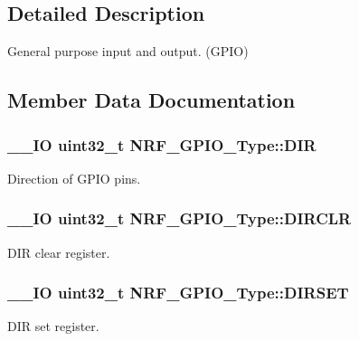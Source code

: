 \subsection{Detailed Description}
General purpose input and output. (G\+P\+I\+O) 

\subsection{Member Data Documentation}
\hypertarget{struct_n_r_f___g_p_i_o___type_a764e29ee686c3f5d869b115a6a54830f}{}
\subsubsection[{D\+I\+R}]{\setlength{\rightskip}{0pt plus 5cm}\+\_\+\+\_\+\+I\+O uint32\+\_\+t N\+R\+F\+\_\+\+G\+P\+I\+O\+\_\+\+Type\+::\+D\+I\+R}\label{struct_n_r_f___g_p_i_o___type_a764e29ee686c3f5d869b115a6a54830f}
Direction of G\+P\+I\+O pins. \hypertarget{struct_n_r_f___g_p_i_o___type_ad112d0855e109acaa63d6a3f1622f1d8}{}
\subsubsection[{D\+I\+R\+C\+L\+R}]{\setlength{\rightskip}{0pt plus 5cm}\+\_\+\+\_\+\+I\+O uint32\+\_\+t N\+R\+F\+\_\+\+G\+P\+I\+O\+\_\+\+Type\+::\+D\+I\+R\+C\+L\+R}\label{struct_n_r_f___g_p_i_o___type_ad112d0855e109acaa63d6a3f1622f1d8}
D\+I\+R clear register. \hypertarget{struct_n_r_f___g_p_i_o___type_ad081475a143678bc52e62834f758ea56}{}
\subsubsection[{D\+I\+R\+S\+E\+T}]{\setlength{\rightskip}{0pt plus 5cm}\+\_\+\+\_\+\+I\+O uint32\+\_\+t N\+R\+F\+\_\+\+G\+P\+I\+O\+\_\+\+Type\+::\+D\+I\+R\+S\+E\+T}\label{struct_n_r_f___g_p_i_o___type_ad081475a143678bc52e62834f758ea56}
D\+I\+R set register. \hypertarget{struct_n_r_f___g_p_i_o___type_a28949911de9b33cc747782d604cb7d95}{}

